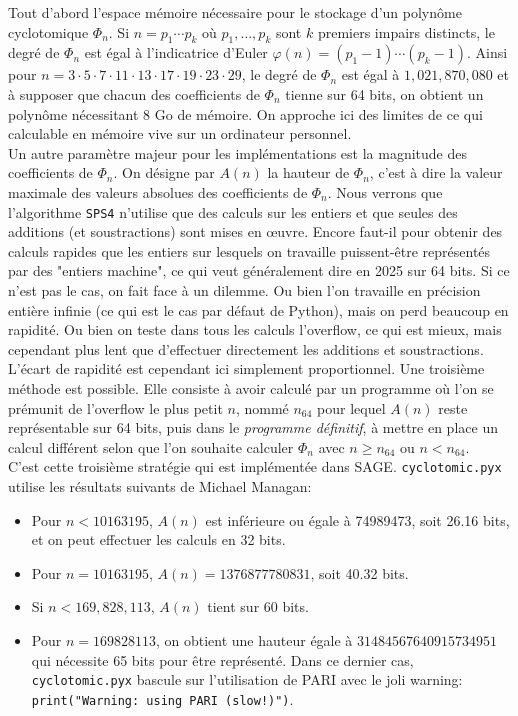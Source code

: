 \documentclass{article}
\newcounter{lemme}
\theoremstyle{break}                  %
\begin{document}
Tout d'abord l'espace mémoire nécessaire pour le stockage d'un polynôme cyclotomique $\Phi_n$. Si $n = p_1 \cdots p_k$ où $p_1, \dots, p_k$ sont $k$ premiers impairs distincts, le degré de $\Phi_n$ est égal à l'indicatrice d'Euler $\varphi(n) = (p_1-1) \cdots (p_k-1)$. Ainsi pour $n = 3 \cdot 5 \cdot 7 \cdot 11 \cdot 13 \cdot 17 \cdot 19 \cdot 23 \cdot 29$, le degré de $\Phi_n$ est égal à $1,021,870,080$ et à supposer que chacun des coefficients de $\Phi_n$ tienne sur 64 bits, on obtient un polynôme nécessitant 8 Go de mémoire. On approche ici des limites de ce qui calculable en mémoire vive sur un ordinateur personnel.\\

Un autre paramètre majeur pour les implémentations est la magnitude des coefficients de $\Phi_n$. On désigne par $A(n)$ la hauteur de $\Phi_n$, c'est à dire la valeur maximale des valeurs absolues des coefficients de $\Phi_n$. Nous verrons que l'algorithme \texttt{SPS4} n'utilise que des calculs sur les entiers et que seules des additions (et soustractions) sont mises en œuvre. Encore faut-il pour obtenir des calculs rapides que les entiers sur lesquels on travaille puissent-être représentés par des "entiers machine", ce qui veut généralement dire en 2025 sur 64 bits. Si ce n'est pas le cas, on fait face à un dilemme. Ou bien l'on travaille en précision entière infinie (ce qui est le cas par défaut de Python), mais on perd beaucoup en rapidité. Ou bien on teste dans tous les calculs l'overflow, ce qui est mieux, mais cependant plus lent que d'effectuer directement les additions et soustractions. L'écart de rapidité est cependant ici simplement proportionnel. Une troisième méthode est possible. Elle consiste à avoir calculé par un programme où l'on se prémunit de l'overflow le plus petit $n$, nommé $n_{64}$ pour lequel $A(n)$ reste représentable sur 64 bits, puis dans le \textit{programme définitif}, à mettre en place un calcul différent selon que l'on souhaite calculer $\Phi_n$ avec $n \ge n_{64}$ ou $n < n_{64}$.\\


C'est cette troisième stratégie qui est implémentée dans SAGE. \texttt{cyclotomic.pyx} utilise les résultats suivants de Michael Managan:
\begin{itemize}
	\item Pour $n<10163195$, $A(n)$ est inférieure ou égale à 74989473, soit 26.16 bits, et on peut effectuer les calculs en 32 bits.
	\item Pour $n=10163195$, $A(n)=1376877780831$,  soit 40.32 bits.
	\item Si $n < 169,828,113$, $A(n)$ tient sur 60 bits.
	\item Pour $n = 169828113$, on obtient une hauteur égale à $31484567640915734951$ qui nécessite 65 bits pour être représenté. Dans ce dernier cas, \texttt{cyclotomic.pyx} bascule sur l'utilisation de PARI avec le joli warning: \texttt{print("Warning: using PARI (slow!)")}.\\
\end{itemize}
\end{document}
